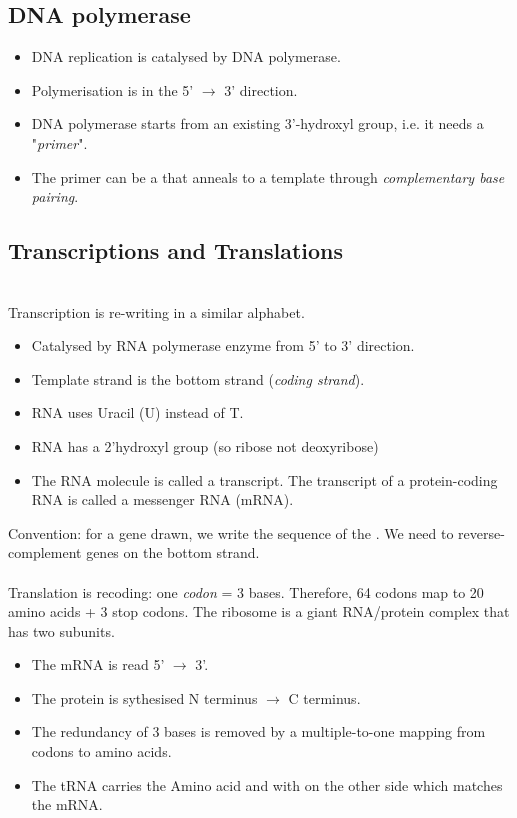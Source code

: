 \subsection{DNA polymerase}
\begin{itemize}
    \item DNA replication is catalysed by DNA polymerase.
    \item Polymerisation is in the 5' $\rightarrow$ 3' direction.
    \item DNA polymerase starts from an existing 3'-hydroxyl group, i.e. it needs a "\textit{primer}".
    \item The primer can be a  that anneals to a template through \textit{complementary base pairing}.
\end{itemize}

\subsection{Transcriptions and Translations}
 \\ [.1in]
Transcription is re-writing in a similar alphabet.
\begin{itemize}
    \item Catalysed by RNA polymerase enzyme from 5' to 3' direction.
    \item Template strand is the bottom strand (\textit{coding strand}).
    \item RNA uses Uracil (U) instead of T.
    \item RNA has a 2'hydroxyl group (so ribose not deoxyribose)
    \item The RNA molecule is called a transcript. The transcript of a protein-coding RNA is called a messenger RNA (mRNA).
\end{itemize}
Convention: for a gene drawn, we write the sequence of the . We need to reverse-complement genes on the bottom strand.\\[.2in]
 \\ [.1in]
Translation is recoding: one \textit{codon} = 3 bases. Therefore, 64 codons map to 20 amino acids + 3 stop codons.  The ribosome is a giant RNA/protein complex that has two subunits.
\begin{itemize}
    \item The mRNA is read 5' $\rightarrow$ 3'.
    \item The protein is sythesised N terminus $\rightarrow$ C terminus.
    \item The redundancy of 3 bases is removed by a multiple-to-one mapping from codons to amino acids.
    \item The tRNA carries the Amino acid and with  on the other side which matches the mRNA. 
\end{itemize}
